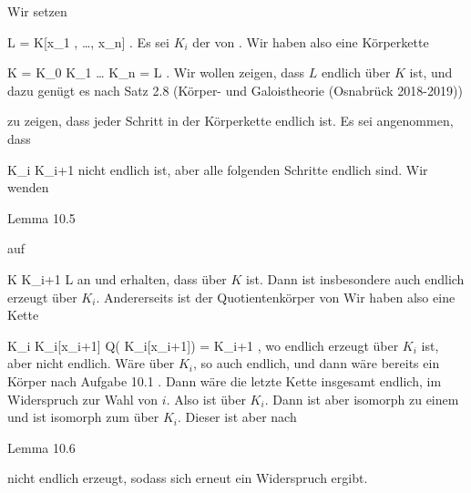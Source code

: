 {





Wir setzen

\mavergleichskette
{\vergleichskette
{ L
}
{ = }{ K[x_1 , \ldots ,  x_n]
}
{  }{
}
{    }{
}
{   }{
}
}
{}{}{.}
Es sei $K_i$ der
von
 {} {.}
Wir haben also eine Körperkette

\mavergleichskettedisp
{\vergleichskette
{ K
}
{ =} { K_0
}
{ \subseteq} { K_1
}
{ \subseteq} { \ldots
}
{ \subseteq} { K_n
}
}
{
\vergleichskettefortsetzung
{ =} { L
}
{ } {}
{ } {}
{ } {}
}{}{.}
Wir wollen zeigen, dass $L$ endlich über $K$ ist, und dazu genügt es
nach
Satz 2.8 (Körper- und Galoistheorie (Osnabrück 2018-2019))

zu zeigen, dass jeder Schritt in der Körperkette endlich ist. Es sei angenommen, dass

\mavergleichskette
{\vergleichskette
{ K_i
}
{ \subseteq }{ K_{i+1}
}
{  }{
}
{    }{
}
{   }{
}
}
{}{}{}
nicht endlich ist, aber alle folgenden Schritte endlich sind. Wir wenden

Lemma 10.5

auf

\mavergleichskettedisp
{\vergleichskette
{K
}
{ \subseteq} { K_{i+1}
}
{ \subset} { L
}
{ } {
}
{ } {
}
}
{}{}{}
an und erhalten, dass
über $K$ ist. Dann ist insbesondere
 auch endlich erzeugt über $K_i$. Andererseits ist
 der Quotientenkörper von
 Wir haben also eine Kette

\mavergleichskettedisp
{\vergleichskette
{ K_i
}
{ \subseteq} { K_i[x_{i+1}]
}
{ \subseteq} { Q( K_i[x_{i+1}])
}
{ =} { K_{i+1}
}
{ } {
}
}
{}{}{,}
wo
 endlich erzeugt über $K_i$ ist, aber nicht endlich. Wäre
über $K_i$, so auch endlich, und dann wäre
 bereits ein Körper
nach
Aufgabe 10.1
.
Dann wäre die letzte Kette insgesamt endlich, im Widerspruch zur Wahl von $i$. Also ist
über $K_i$. Dann ist aber
 isomorph zu einem
und
 ist isomorph zum
über $K_i$. Dieser ist aber nach

Lemma 10.6

nicht endlich erzeugt, sodass sich erneut ein Widerspruch ergibt.




}






